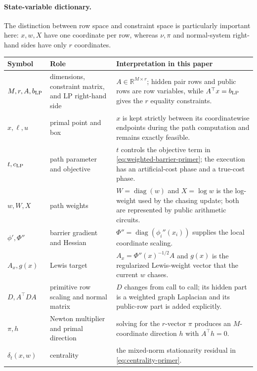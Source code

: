 \documentclass[11pt]{article}
\theoremstyle{definition}
\newcommand{\R}{\mathbb{R}}
\newcommand{\diag}{\operatorname{diag}}
\begin{document}
\paragraph{State-variable dictionary.}
The distinction between row space and constraint space is particularly
important here: $x,w,X$ have one coordinate per row, whereas $\nu,\pi$ and
normal-system right-hand sides have only $r$ coordinates.
\begin{center}
\small
\begin{tabular}{@{}p{.18\linewidth}p{.30\linewidth}p{.44\linewidth}@{}}
\toprule
Symbol & Role & Interpretation in this paper\\
\midrule
$M,r,A,b_{\rm LP}$ & dimensions, constraint matrix, and LP right-hand side
  & $A\in\R^{M\times r}$; hidden pair rows and public rows are row variables,
    while $A^\top x=b_{\rm LP}$ gives the $r$ equality constraints.\\
$x,\ell,u$ & primal point and box
  & $x$ is kept strictly between its coordinatewise endpoints during the
    path computation and remains exactly feasible.\\
$t,c_{\rm LP}$ & path parameter and objective
  & $t$ controls the objective term in \eqref{eq:weighted-barrier-primer};
    the execution has an artificial-cost phase and a true-cost phase.\\
$w,W,X$ & path weights
  & $W=\diag(w)$ and $X=\log w$ is the log-weight used by the chasing
    update; both are represented by public arithmetic circuits.\\
$\phi',\Phi''$ & barrier gradient and Hessian
  & $\Phi''=\diag(\phi_i''(x_i))$ supplies the local coordinate scaling.\\
$A_x,g(x)$ & Lewis target
  & $A_x=\Phi''(x)^{-1/2}A$ and $g(x)$ is the regularized Lewis-weight vector
    that the current $w$ chases.\\
$D,A^\top DA$ & primitive row scaling and normal matrix
  & $D$ changes from call to call; its hidden part is a weighted graph
    Laplacian and its public-row part is added explicitly.\\
$\pi,h$ & Newton multiplier and primal direction
  & solving for the $r$-vector $\pi$ produces an $M$-coordinate direction
    $h$ with $A^\top h=0$.\\
$\delta_t(x,w)$ & centrality
  & the mixed-norm stationarity residual in
    \eqref{eq:centrality-primer}.\\
\bottomrule
\end{tabular}
\end{center}
\end{document}
